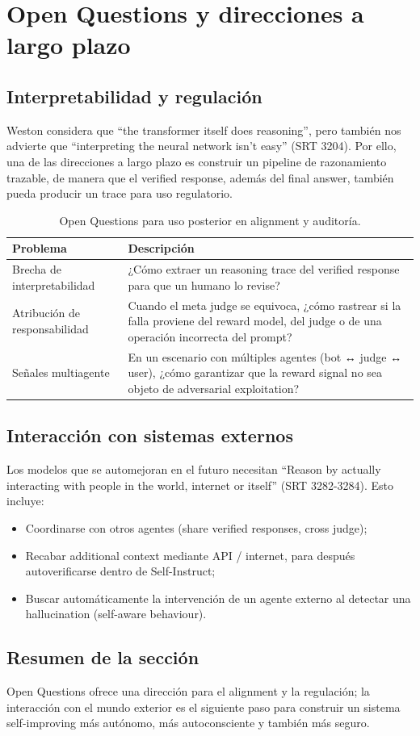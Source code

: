 \section{Open Questions y direcciones a largo plazo}
\subsection{Interpretabilidad y regulación}
Weston considera que ``the transformer itself does reasoning'', pero también nos advierte que ``interpreting the neural network isn't easy'' (SRT 3204). Por ello, una de las direcciones a largo plazo es construir un pipeline de razonamiento trazable, de manera que el verified response, además del final answer, también pueda producir un trace para uso regulatorio.

\begin{table}[H]
\centering
\begin{tabular}{p{5cm}p{10cm}}
\toprule
Problema & Descripción \\
\midrule
Brecha de interpretabilidad & ¿Cómo extraer un reasoning trace del verified response para que un humano lo revise? \\
Atribución de responsabilidad & Cuando el meta judge se equivoca, ¿cómo rastrear si la falla proviene del reward model, del judge o de una operación incorrecta del prompt? \\
Señales multiagente & En un escenario con múltiples agentes (bot ↔ judge ↔ user), ¿cómo garantizar que la reward signal no sea objeto de adversarial exploitation? \\
\bottomrule
\end{tabular}
\caption{Open Questions para uso posterior en alignment y auditoría.}
\end{table}

\subsection{Interacción con sistemas externos}
Los modelos que se automejoran en el futuro necesitan ``Reason by actually interacting with people in the world, internet or itself'' (SRT 3282-3284). Esto incluye:
\begin{itemize}
    \item Coordinarse con otros agentes (share verified responses, cross judge);
    \item Recabar additional context mediante API / internet, para después autoverificarse dentro de Self-Instruct;
    \item Buscar automáticamente la intervención de un agente externo al detectar una hallucination (self-aware behaviour).
\end{itemize}

\subsection{Resumen de la sección}
Open Questions ofrece una dirección para el alignment y la regulación; la interacción con el mundo exterior es el siguiente paso para construir un sistema self-improving más autónomo, más autoconsciente y también más seguro.

